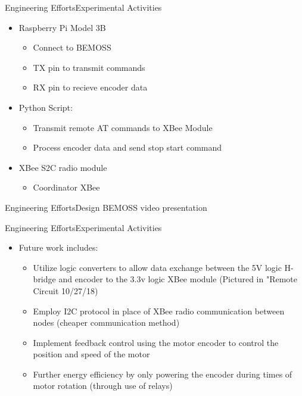 \documentclass{beamer}
\begin{document}
\begin{frame}{Engineering Efforts}{Experimental Activities}

 
\begin{itemize}
        \item Raspberry Pi Model 3B
        \begin{itemize}
            \item Connect to BEMOSS
            \item TX pin to transmit commands
            \item RX pin to recieve encoder data 

        \end{itemize}  
        \item Python Script:
            \begin{itemize}
            \item Transmit remote AT commands to XBee Module
            \item Process encoder data and send stop start command
            \end{itemize}

        \item XBee S2C radio module 
            \begin{itemize} 
                \item Coordinator XBee
        \end{itemize}
    \end{itemize}

\end{frame} 

\begin{frame}{Engineering Efforts}{Design}
  BEMOSS video presentation 
\end{frame}


\begin{frame}{Engineering Efforts}{Experimental Activities}


    \begin{itemize}
        \item Future work includes:
            \begin{itemize}
                \item Utilize logic converters to allow data exchange between the 5V logic H-bridge and encoder to the 3.3v logic XBee module (Pictured in "Remote Circuit 10/27/18)
                \item Employ I2C protocol in place of XBee radio communication between nodes (cheaper communication method)
                \item Implement feedback control using the motor encoder to control the position and speed of the motor
                \item Further energy efficiency by only powering the encoder during times of motor rotation (through use of relays)
 
    \end{itemize}
    \end{itemize}

\end{frame} 
\end{document}
